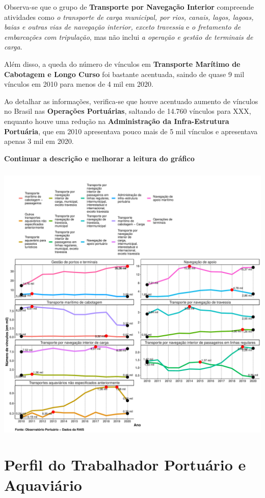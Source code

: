 \documentclass[
]{article}
\begin{document}
Observa-se que o grupo de \textbf{Transporte por Navegação Interior}
compreende atividades como \emph{o transporte de carga municipal, por
rios, canais, lagos, lagoas, baias e outras vias de navegação interior,
exceto travessia} e \emph{o fretamento de embarcações com tripulação},
mas não inclui \emph{a operação e gestão de terminais de carga}.

Além disso, a queda do número de vínculos em \textbf{Transporte Marítimo
de Cabotagem e Longo Curso} foi bastante acentuada, saindo de quase 9
mil vínculos em 2010 para menos de 4 mil em 2020.

Ao detalhar as informações, verifica-se que houve acentuado aumento de
vínculos no Brasil nas \textbf{Operações Portuárias}, saltando de 14.760
vínculos para XXX, enquanto houve uma redução na \textbf{Administração
da Infra-Estrutura Portuária}, que em 2010 apresentava pouco mais de 5
mil vínculos e apresentava apenas 3 mil em 2020.

\textbf{Continuar a descrição e melhorar a leitura do gráfico}

\hypertarget{section}{%
\subparagraph{}\label{section}}

\includegraphics{mercado_trabalho_files/figure-latex/funcao2-1.pdf}

\hypertarget{perfil-do-trabalhador-portuuxe1rio-e-aquaviuxe1rio}{%
\section{Perfil do Trabalhador Portuário e
Aquaviário}\label{perfil-do-trabalhador-portuuxe1rio-e-aquaviuxe1rio}}
\end{document}
